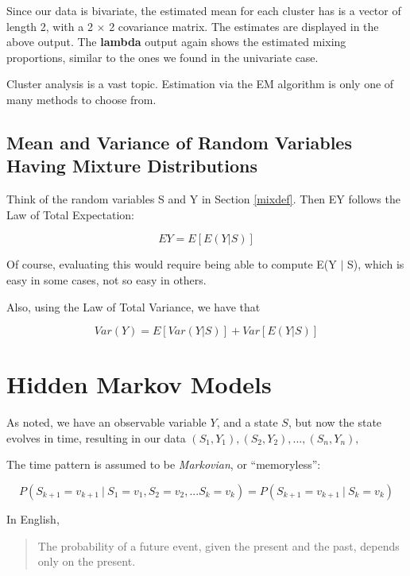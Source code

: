 \documentclass[11pt]{article}
\begin{document}
Since our data is bivariate, the estimated mean for each cluster has
is a vector of length 2, with a 2 $\times$ 2 covariance matrix.  The
estimates are displayed in the above output.  The \textbf{lambda} output
again shows the estimated mixing proportions, similar to the ones we
found in the univariate case.

Cluster analysis is a vast topic.  Estimation via the EM algorithm is
only one of many methods to choose from.

\subsection{Mean and Variance of Random Variables Having Mixture
Distributions}
\label{mixmeanvar}

Think of the random variables S and Y in Section \ref{mixdef}.
Then EY follows the Law of Total Expectation:

\begin{equation}
\label{mixmean}
EY = E[E(Y | S)]
\end{equation}

Of course, evaluating this would require being able to compute E(Y $|$
S), which is easy in some cases, not so easy in others.

Also, using the Law of Total Variance, we have that

\begin{equation}
\label{mixvar}
Var(Y) = E[Var(Y|S)] + Var[E(Y|S)]
\end{equation}

\section{Hidden Markov Models}

As noted, we have an observable variable $Y$, and a state $S$, but now
the state evolves in time, resulting in our data
$
(S_1,Y_1),
(S_2,Y_2),
...,
(S_n,Y_n),
$

The time pattern is assumed to be \textit{Markovian}, or ``memoryless'':

\begin{equation}
P(S_{k+1} = v_{k+1} ~|~ S_1 = v_1, S_2 = v_2, ...  S_k = v_k) =
P(S_{k+1} = v_{k+1} ~|~ S_k = v_k) 
\end{equation}

In English,

\begin{quote}
The probability of a future event, given the present and the past,
depends only on the present.
\end{quote}
\end{document}
